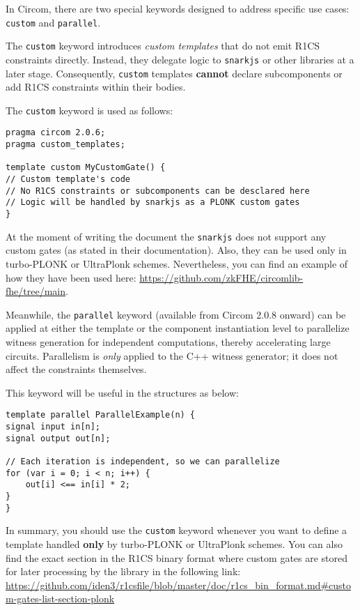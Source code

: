 \documentclass[../lecture-notes-148x210.tex]{subfiles}
\begin{document}
In Circom, there are two special keywords designed to address specific use cases: \texttt{custom} and \texttt{parallel}.

The \texttt{custom} keyword introduces \emph{custom templates} that do not emit R1CS constraints directly.
Instead, they delegate logic to \texttt{snarkjs} or other libraries at a later stage.
Consequently, \texttt{custom} templates \textbf{cannot} declare subcomponents or add R1CS constraints within their bodies.

The \texttt{custom} keyword is used as follows:

\begin{lstlisting}[language=Circom,basicstyle=\ttfamily\footnotesize]
pragma circom 2.0.6;
pragma custom_templates;

template custom MyCustomGate() {
// Custom template's code
// No R1CS constraints or subcomponents can be desclared here
// Logic will be handled by snarkjs as a PLONK custom gates
}
\end{lstlisting}

\begin{remark}
    At the moment of writing the document the \texttt{snarkjs} does not support any custom gates (as stated in their documentation).
    Also, they can be used only in turbo-PLONK or UltraPlonk schemes.
    Nevertheless, you can find an example of how they have been used here: \url{https://github.com/zkFHE/circomlib-fhe/tree/main}.
\end{remark}

Meanwhile, the \texttt{parallel} keyword (available from Circom 2.0.8 onward) can be applied at either the template or
the component instantiation level to parallelize witness generation for independent computations, thereby accelerating large circuits.
Parallelism is \emph{only} applied to the C++ witness generator; it does not affect the constraints themselves.

This keyword will be useful in the structures as below:

\begin{lstlisting}[language=Circom,basicstyle=\ttfamily\footnotesize]
template parallel ParallelExample(n) {
signal input in[n];
signal output out[n];

// Each iteration is independent, so we can parallelize
for (var i = 0; i < n; i++) {
    out[i] <== in[i] * 2;
}
}
\end{lstlisting}

In summary, you should use the \texttt{custom} keyword whenever you want to define a template handled \textbf{only} by turbo-PLONK or UltraPlonk schemes.
You can also find the exact section in the R1CS binary format where custom gates are stored for later processing by the library in the following link: \\
\url{https://github.com/iden3/r1csfile/blob/master/doc/r1cs_bin_format.md\#custom-gates-list-section-plonk}
\end{document}
